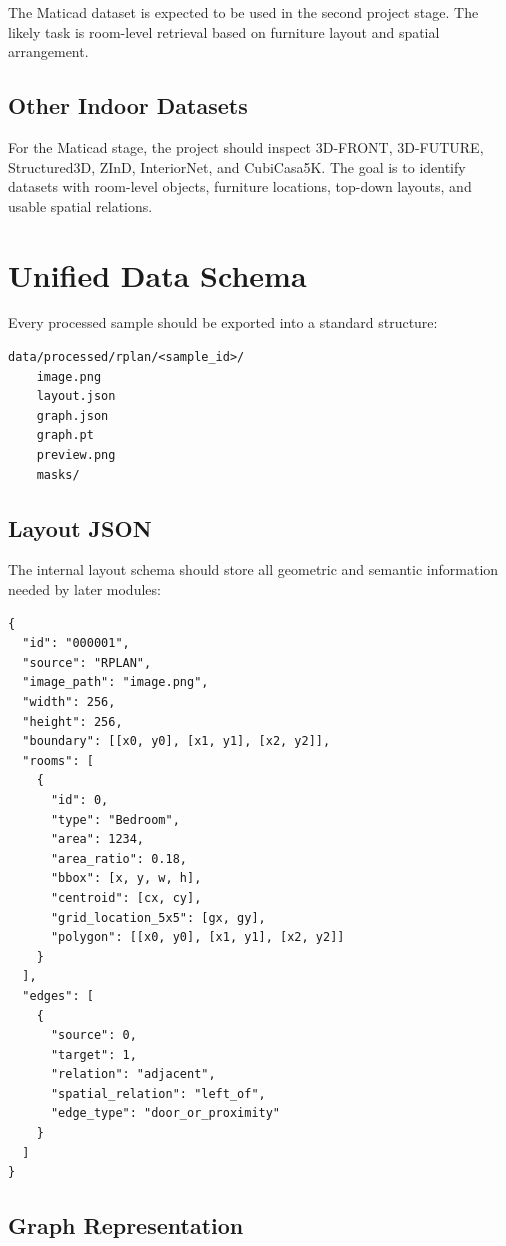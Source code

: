 \documentclass[11pt,a4paper]{article}
\begin{document}
The Maticad dataset is expected to be used in the second project stage. The likely task is room-level retrieval based on furniture layout and spatial arrangement.

\subsection{Other Indoor Datasets}

For the Maticad stage, the project should inspect 3D-FRONT, 3D-FUTURE, Structured3D, ZInD, InteriorNet, and CubiCasa5K. The goal is to identify datasets with room-level objects, furniture locations, top-down layouts, and usable spatial relations.

\section{Unified Data Schema}

Every processed sample should be exported into a standard structure:

\begin{verbatim}
data/processed/rplan/<sample_id>/
    image.png
    layout.json
    graph.json
    graph.pt
    preview.png
    masks/
\end{verbatim}

\subsection{Layout JSON}

The internal layout schema should store all geometric and semantic information needed by later modules:

\begin{verbatim}
{
  "id": "000001",
  "source": "RPLAN",
  "image_path": "image.png",
  "width": 256,
  "height": 256,
  "boundary": [[x0, y0], [x1, y1], [x2, y2]],
  "rooms": [
    {
      "id": 0,
      "type": "Bedroom",
      "area": 1234,
      "area_ratio": 0.18,
      "bbox": [x, y, w, h],
      "centroid": [cx, cy],
      "grid_location_5x5": [gx, gy],
      "polygon": [[x0, y0], [x1, y1], [x2, y2]]
    }
  ],
  "edges": [
    {
      "source": 0,
      "target": 1,
      "relation": "adjacent",
      "spatial_relation": "left_of",
      "edge_type": "door_or_proximity"
    }
  ]
}
\end{verbatim}

\subsection{Graph Representation}
\end{document}
